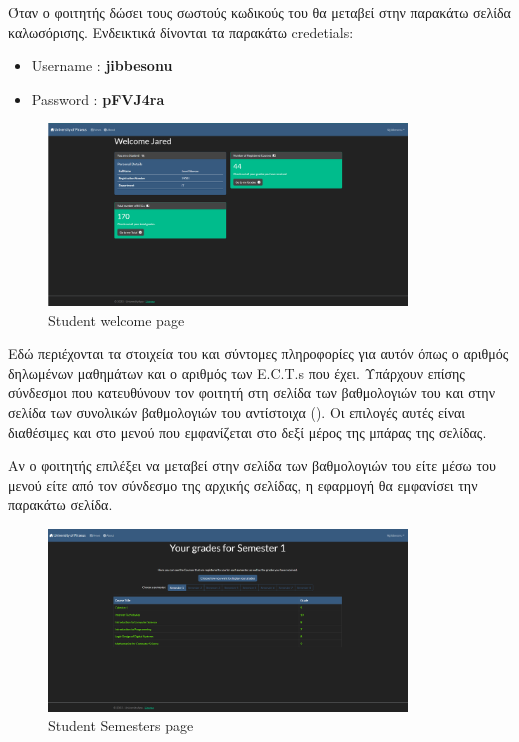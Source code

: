 \documentclass[12pt]{article}
\begin{document}
	Όταν ο φοιτητής δώσει τους σωστούς κωδικούς του θα μεταβεί στην παρακάτω σελίδα καλωσόρισης. Ενδεικτικά δίνονται τα παρακάτω credetials:
	
	\begin{itemize}
		\item Username : \textbf{jibbesonu}
		\item Password : \textbf{pFVJ4ra}
	\end{itemize}



	\begin{figure}[H]
	\centering
	\includegraphics[width=0.85\textwidth]{studentwel.png}
	\caption{Student welcome page}
	\label{fig:emptyView}
	\end{figure}

	Εδώ περιέχονται τα στοιχεία του και σύντομες πληροφορίες για αυτόν όπως ο αριθμός δηλωμένων μαθημάτων και ο αριθμός των E.C.T.s που έχει. Υπάρχουν επίσης σύνδεσμοι που κατευθύνουν τον φοιτητή στη σελίδα των βαθμολογιών του και στην σελίδα των συνολικών βαθμολογιών του αντίστοιχα (). Οι επιλογές αυτές είναι διαθέσιμες και στο μενού που εμφανίζεται στο δεξί μέρος της μπάρας της σελίδας.
	
	Αν ο φοιτητής επιλέξει να μεταβεί στην σελίδα των βαθμολογιών του είτε μέσω του μενού είτε από τον σύνδεσμο της αρχικής σελίδας, η εφαρμογή θα εμφανίσει την παρακάτω σελίδα.
	
	\begin{figure}[H]
		\centering
		\includegraphics[width=0.85\textwidth]{semesters1.png}
		\caption{Student Semesters page}
		\label{fig:emptyView}
	\end{figure}
	
\end{document}
